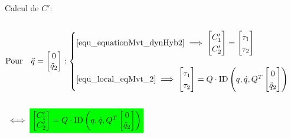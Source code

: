\documentclass[10pt]{beamer}
\begin{document}
\begin{frame}
  \bigskip
	Calcul de $C'$: 
	\begin{columns}[onlytextwidth]
	\begin{column}[c]{0.8\textwidth}\footnotesize
	\begin{align*}
	&\textnormal{Pour} \quad \ddot{q}=
	\begin{bmatrix}
	  0 \\
	  \ddot{q}_2
	\end{bmatrix}
	: 
	\begin{cases}
	\eqref{equ_equationMvt_dynHyb2}
	\implies
	\begin{bmatrix}
	  C'_1 \\
	  C'_2
	\end{bmatrix}
	=
	\begin{bmatrix}
	  \tau_1 \\
	  \tau_2
	\end{bmatrix} \\
	& \\
	\eqref{equ_local_eqMvt_2}
	\implies
	\begin{bmatrix}
	  \tau_1 \\
	  \tau_2
	\end{bmatrix}
	=
	Q \cdot \mathrm{ID} \left( q,\dot{q},Q^T
	\begin{bmatrix}
	  0 \\
	  \ddot{q}_2
	\end{bmatrix} \right)
	\end{cases} \\
	\notag \\
	&\iff
	\colorbox{green}{$
	\begin{bmatrix}
	  C'_1 \\
	  C'_2
	\end{bmatrix}
	=
	Q \cdot \mathrm{ID} \left( q,\dot{q},Q^T
	\begin{bmatrix}
	  0 \\
	  \ddot{q}_2
	\end{bmatrix} \right)$}
	\end{align*}
	\end{column}
	\begin{column}[c]{0.27\textwidth}
	\end{column}
	\end{columns}
  
\end{frame}
\end{document}
